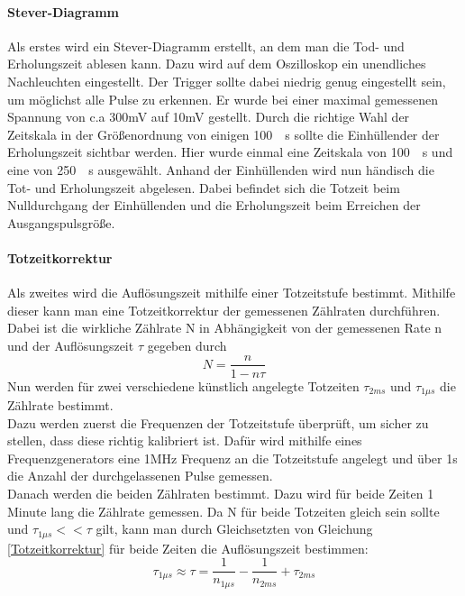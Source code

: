 \documentclass[12pt,a4paper]{article}
\begin{document}
\paragraph{Stever-Diagramm}
Als erstes wird ein Stever-Diagramm erstellt, an dem man die Tod- und Erholungszeit ablesen kann. Dazu wird auf dem Oszilloskop ein unendliches Nachleuchten eingestellt. Der Trigger sollte dabei niedrig genug eingestellt sein, um möglichst alle Pulse zu erkennen. Er wurde bei einer maximal gemessenen Spannung von c.a 300mV auf 10mV gestellt. Durch die richtige Wahl der Zeitskala in der Größenordnung von einigen \SI{100}{\mu s} sollte die Einhüllender der Erholungszeit sichtbar werden. Hier wurde einmal eine Zeitskala von \SI{100}{\mu s} und eine von \SI{250}{\mu s} ausgewählt. Anhand der Einhüllenden wird nun händisch die Tot- und Erholungszeit abgelesen. Dabei befindet sich die Totzeit beim Nulldurchgang der Einhüllenden und die Erholungszeit beim Erreichen der Ausgangspulsgröße. 

\paragraph{Totzeitkorrektur}
Als zweites wird die Auflösungszeit mithilfe einer Totzeitstufe bestimmt. Mithilfe dieser kann man eine Totzeitkorrektur der gemessenen Zählraten durchführen. Dabei ist die wirkliche Zählrate N in Abhängigkeit von der gemessenen Rate n und der Auflösungszeit $\tau$ gegeben durch 
\begin{equation}
\label{Totzeitkorrektur}
N = \dfrac{n}{1-n\tau}
\end{equation}
Nun werden für zwei verschiedene künstlich angelegte Totzeiten $\tau_{2ms}$ und $\tau_{1\mu s}$ die Zählrate bestimmt.\\Dazu werden zuerst die Frequenzen der Totzeitstufe überprüft, um sicher zu stellen, dass diese richtig kalibriert ist. Dafür wird mithilfe eines Frequenzgenerators eine 1MHz Frequenz an die Totzeitstufe angelegt und über 1s die Anzahl der durchgelassenen Pulse gemessen.\\
Danach werden die beiden Zählraten bestimmt. Dazu wird für beide Zeiten 1 Minute lang die Zählrate gemessen. Da N für beide Totzeiten gleich sein sollte und $\tau_{1\mu s} << \tau$ gilt, kann man durch Gleichsetzten von Gleichung \ref{Totzeitkorrektur} für beide Zeiten die Auflösungszeit bestimmen:
\begin{equation}
\tau_{1\mu s} \approx \tau = \dfrac{1}{n_{1\mu s}} - \dfrac{1}{n_{2ms}} + \tau_{2ms}
\label{Auslosungszeit}
\end{equation}
\end{document}
